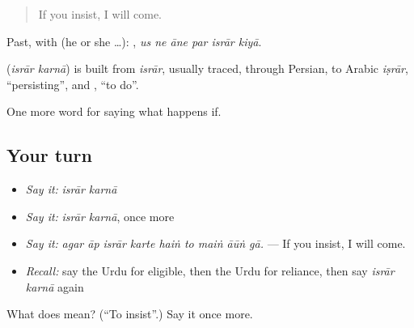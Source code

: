 \begin{quote}
If you insist, I will come.
\end{quote}

Past, with  (he or she …):      , \emph{us ne āne par isrār kiyā}.

\begin{cousinweb}
\textbf{ } (\emph{isrār karnā}) is built from \emph{isrār}, usually traced, through Persian, to Arabic \emph{iṣrār}, \textquotedblleft{}persisting\textquotedblright{}, and \textbf{}, \textquotedblleft{}to do\textquotedblright{}.
\end{cousinweb}

\begin{grammarlens}[title={What you've built}]
One more word for saying what happens if.
\end{grammarlens}

\subsection*{Your turn}
\begin{itemize}
\raggedright
  \item \emph{Say it:} \emph{isrār karnā}
  \item \emph{Say it:} \emph{isrār karnā}, once more
  \item \emph{Say it:} \emph{agar āp isrār karte haiṅ to maiṅ āūṅ gā.} — If you insist, I will come.
  \item \emph{Recall:} say the Urdu for eligible, then the Urdu for reliance, then say \emph{isrār karnā} again
\end{itemize}

\begin{tcolorbox}[breakable,colback=teal!4,colframe=teal!35!black,title={Before you move on}]
What does   mean? (\textquotedblleft{}To insist\textquotedblright{}.) Say it once more.
\end{tcolorbox}

